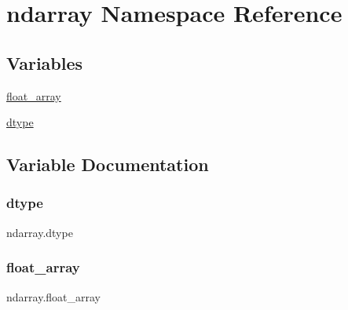 \hypertarget{namespacendarray}{}\section{ndarray Namespace Reference}
\label{namespacendarray}
\subsection*{Variables}
\begin{DoxyCompactItemize}
\item 
\hyperlink{namespacendarray_afb39acd5e2449f160a87ceaf3ade73dd}{float\+\_\+array}
\item 
\hyperlink{namespacendarray_a27711ae2473392bdbfd2a05c77dd8a36}{dtype}
\end{DoxyCompactItemize}


\subsection{Variable Documentation}
\mbox{\label{namespacendarray_a27711ae2473392bdbfd2a05c77dd8a36}} 
\subsubsection{\texorpdfstring{dtype}{dtype}}
{\footnotesize\ttfamily ndarray.\+dtype}

\mbox{\label{namespacendarray_afb39acd5e2449f160a87ceaf3ade73dd}} 
\subsubsection{\texorpdfstring{float\+\_\+array}{float\_array}}
{\footnotesize\ttfamily ndarray.\+float\+\_\+array}

